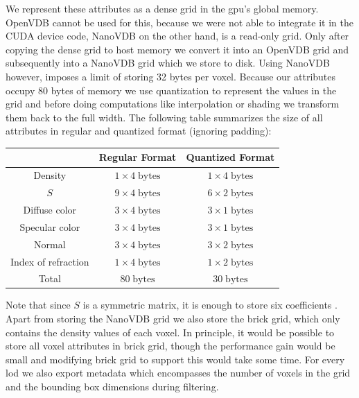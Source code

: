 We represent these attributes as a dense grid in the \acs{gpu}'s global memory.
OpenVDB cannot be used for this, because we were not able to integrate it in the CUDA device code, NanoVDB on the other hand, is a read-only grid.
Only after copying the dense grid to host memory we convert it into an OpenVDB grid and subsequently into a NanoVDB grid which we store to disk.
Using NanoVDB however, imposes a limit of storing 32 bytes per voxel.
Because our attributes occupy 80 bytes of memory we use quantization to represent the values in the grid and before doing computations like interpolation or shading we transform them back to the full width.
The following table summarizes the size of all attributes in regular and quantized format (ignoring padding):
\begin{center}
    \begin{tabular}{| c | c | c | }
        \hline
         & Regular Format & Quantized Format \\
         \hline
         Density & $1\times 4\;\text{bytes}$ & $1\times 4\;\text{bytes}$ \\
         \hline
         $S$ & $9\times 4\;\text{bytes}$ & $6\times 2\;\text{bytes}$ \\
         \hline
         Diffuse color & $3\times 4\;\text{bytes}$ & $3\times 1\;\text{bytes}$ \\
         \hline
         Specular color & $3\times 4\;\text{bytes}$ & $3\times 1\;\text{bytes}$ \\
         \hline
         Normal & $3\times 4\;\text{bytes}$ & $3\times 2\;\text{bytes}$ \\
         \hline
         Index of refraction & $1\times 4\;\text{bytes}$ & $1\times 2\;\text{bytes}$ \\
         \thickhline
         Total & $80\;\text{bytes}$ & $30\;\text{bytes}$ \\
         \hline
    \end{tabular}
\end{center}
Note that since $S$ is a symmetric matrix, it is enough to store six coefficients \cite{sggx}.
Apart from storing the NanoVDB grid we also store the brick grid, which only contains the density values of each voxel.
In principle, it would be possible to store all voxel attributes in brick grid, though the performance gain would be small and modifying brick grid to support this would take some time.
For every \ac{lod} we also export metadata which encompasses the number of voxels in the grid and the bounding box dimensions during filtering.

